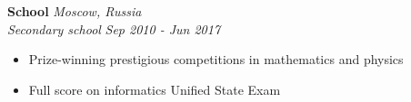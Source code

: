 \documentclass[letterpaper, 11pt]{article}
\newcommand{\ExternalLink}{%
    \tikz[x=1.2ex, y=1.2ex, baseline=-0.05ex]{%
        \begin{scope}[x=1ex, y=1ex]
            \clip (-0.1,-0.1) 
                --++ (-0, 1.2) 
                --++ (0.6, 0) 
                --++ (0, -0.6) 
                --++ (0.6, 0) 
                --++ (0, -1);
            \path[draw, 
                line width = 0.5, 
                rounded corners=0.5] 
                (0,0) rectangle (1,1);
        \end{scope}
        \path[draw, line width = 0.5] (0.5, 0.5) 
            -- (1, 1);
        \path[draw, line width = 0.5] (0.6, 1) 
            -- (1, 1) -- (1, 0.6);
    }
}
\begin{document}
\vspace{6pt}

{\large \textbf{School }} \hfill \textsl{Moscow, Russia} \\
{\small \textsl{Secondary school}} \hfill \textsl{Sep 2010 - Jun 2017} \\

\vspace{4pt}

\begin{addmargin}[0em]{10em}
    \begin{itemize}
        \setlength\itemsep{-2pt}
        \item Prize-winning prestigious competitions in mathematics and physics
        \item Full score on informatics Unified State Exam
    \end{itemize}{}
\end{addmargin}

\vspace{6pt}

\begin{comment}
\section{Work experience}

{\large \textbf{SmartDec} \hspace{-4pt} \href{https://smartdec.net}{\color{blue}\ExternalLink}} \hfill \textsl{Moscow, Russia} \\
{\small \textsl{Intern; development \& analytics}} \hfill \textsl{Aug 2019 - Jun 2020}

\vspace{4pt}

\textbf{Cryptography and zero-knowledge proofs:}

\vspace{2pt}

\begin{addmargin}[0em]{10em}
    \begin{itemize}
        \setlength\itemsep{-2pt}
        \item Developed a digital signature protocol resistant to owner classification
        \item Designed and implemented Merkle tree zk-SNARK in \href{https://github.com/iden3/circom}{\color{blue}\textbf{Circom}} (JavaScript-based arithmetic circuits compiler) and \href{https://docs.rs/bellman/0.2.0/bellman/}{\color{blue}\textbf{bellman}} (Rust crate for building zk-SNARK circuits)
    \end{itemize}
\end{addmargin}

\end{comment}
\end{document}
